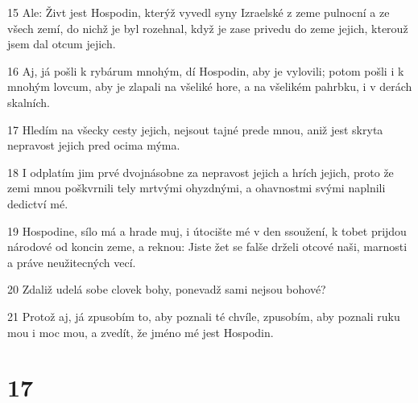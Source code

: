 \par 15 Ale: Živt jest Hospodin, kterýž vyvedl syny Izraelské z zeme pulnocní a ze všech zemí, do nichž je byl rozehnal, když je zase privedu do zeme jejich, kterouž jsem dal otcum jejich.
\par 16 Aj, já pošli k rybárum mnohým, dí Hospodin, aby je vylovili; potom pošli i k mnohým lovcum, aby je zlapali na všeliké hore, a na všelikém pahrbku, i v derách skalních.
\par 17 Hledím na všecky cesty jejich, nejsout tajné prede mnou, aniž jest skryta nepravost jejich pred ocima mýma.
\par 18 I odplatím jim prvé dvojnásobne za nepravost jejich a hrích jejich, proto že zemi mnou poškvrnili tely mrtvými ohyzdnými, a ohavnostmi svými naplnili dedictví mé.
\par 19 Hospodine, sílo má a hrade muj, i útocište mé v den ssoužení, k tobet prijdou národové od koncin zeme, a reknou: Jiste žet se falše drželi otcové naši, marnosti a práve neužitecných vecí.
\par 20 Zdaliž udelá sobe clovek bohy, ponevadž sami nejsou bohové?
\par 21 Protož aj, já zpusobím to, aby poznali té chvíle, zpusobím, aby poznali ruku mou i moc mou, a zvedít, že jméno mé jest Hospodin.

\chapter{17}

